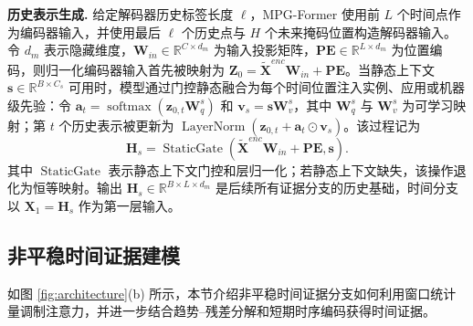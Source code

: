 \documentclass[UTF8]{ctexart}
\begin{document}
\noindent\textbf{历史表示生成.}
给定解码器历史标签长度 $\ell$，MPG-Former 使用前 $L$ 个时间点作为编码器输入，并使用最后 $\ell$ 个历史点与 $H$ 个未来掩码位置构造解码器输入。令 $d_m$ 表示隐藏维度，$\mathbf W_{in}\in\mathbb R^{C\times d_m}$ 为输入投影矩阵，$\mathbf{PE}\in\mathbb R^{L\times d_m}$ 为位置编码，则归一化编码器输入首先被映射为 $\mathbf Z_0=\tilde{\mathbf X}^{enc}\mathbf W_{in}+\mathbf{PE}$。当静态上下文 $\mathbf s\in\mathbb R^{B\times C_s}$ 可用时，模型通过门控静态融合为每个时间位置注入实例、应用或机器级先验：令 $\mathbf a_t=\operatorname{softmax}(\mathbf z_{0,t}\mathbf W_q^{s})$ 和 $\mathbf v_s=\mathbf s\mathbf W_v^{s}$，其中 $\mathbf W_q^{s}$ 与 $\mathbf W_v^{s}$ 为可学习映射；第 $t$ 个历史表示被更新为 $\operatorname{LayerNorm}(\mathbf z_{0,t}+\mathbf a_t\odot\mathbf v_s)$。该过程记为
\begin{equation}
    \mathbf H_s=\operatorname{StaticGate}(\tilde{\mathbf X}^{enc}\mathbf W_{in}+\mathbf{PE},\mathbf s).
    \label{eq:mpg_history_repr_new}
\end{equation}
其中 $\operatorname{StaticGate}$ 表示静态上下文门控和层归一化；若静态上下文缺失，该操作退化为恒等映射。输出 $\mathbf H_s\in\mathbb R^{B\times L\times d_m}$ 是后续所有证据分支的历史基础，时间分支以 $\mathbf X_1=\mathbf H_s$ 作为第一层输入。

\subsection{非平稳时间证据建模}
\label{sec:temporal_evidence}

如图 \ref{fig:architecture}(b) 所示，本节介绍非平稳时间证据分支如何利用窗口统计量调制注意力，并进一步结合趋势--残差分解和短期时序编码获得时间证据。
\end{document}
